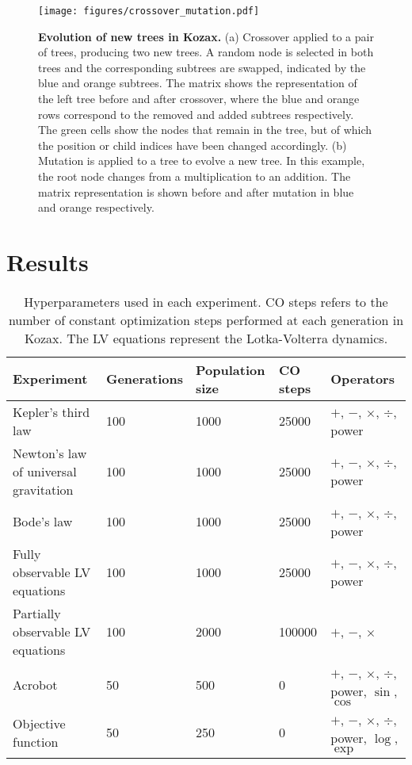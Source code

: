 \documentclass{article}
\begin{document}
\begin{figure*}[!t]
    \centering
    \texttt{[image: figures/crossover\_mutation.pdf]}
    \caption{\textbf{Evolution of new trees in Kozax.} (a) Crossover applied to a pair of trees, producing two new trees. A random node is selected in both trees and the corresponding subtrees are swapped, indicated by the blue and orange subtrees. The matrix shows the representation of the left tree before and after crossover, where the blue and orange rows correspond to the removed and added subtrees respectively. The green cells show the nodes that remain in the tree, but of which the position or child indices have been changed accordingly. (b) Mutation is applied to a tree to evolve a new tree. In this example, the root node changes from a multiplication to an addition. The matrix representation is shown before and after mutation in blue and orange respectively.}
    \label{fig: evolution}
\end{figure*}

\section{Results}
\begin{table}[!t]
\begin{small}
    
    \begin{tabular}{lllll}
    \toprule
    \textbf{Experiment} & \textbf{Generations} & \textbf{Population size} & \textbf{CO steps} & \textbf{Operators}\\
    \midrule
       Kepler's third law & 100 & 1000 & 25000 & $+$, $-$, $\times$, $\div$, power\\
       Newton's law of universal gravitation &100& 1000 & 25000 & $+$, $-$, $\times$, $\div$, power\\
       Bode's law & 100 & 1000 & 25000 & $+$, $-$, $\times$, $\div$, power\\
       Fully observable LV equations & 100 & 1000 & 25000 & $+$, $-$, $\times$, $\div$, power\\
        Partially observable LV equations & 100 & 2000 & 100000 & $+$, $-$, $\times$ \\
       Acrobot & 50 & 500 & 0 & $+$, $-$, $\times$, $\div$, power, $\sin$, $\cos$\\
       Objective function & 50 & 250 & 0 & $+$, $-$, $\times$, $\div$, power, $\log$, $\exp$\\
       \bottomrule
    \end{tabular}
    \centering
 \caption{Hyperparameters used in each experiment. CO steps refers to the number of constant optimization steps performed at each generation in Kozax. The LV equations represent the Lotka-Volterra dynamics.}
    \label{tab:hyperparam}
    \end{small}
\end{table}
\end{document}

